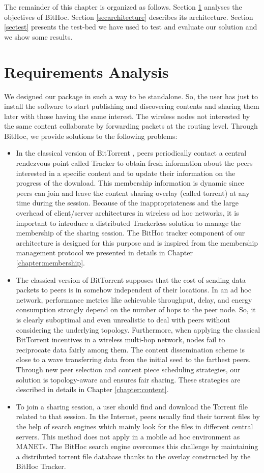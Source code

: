 The remainder of this chapter is organized as follows. Section \ref{secreq} analyses the objectives of BitHoc. Section \ref{secarchitecture} describes its architecture. Section \ref{sectest} presents the test-bed we have used to test and evaluate our solution and we show some results.


\section{Requirements Analysis}
\label{secreq}
 We designed our package in such a way to be standalone. So, the user has just to install the software to start publishing and discovering contents and sharing them later with those having the same interest. The wireless nodes not interested by the same content collaborate by forwarding packets at the routing level. Through BitHoc, we provide solutions to the following problems:
\begin{itemize}
\item{In the classical version of BitTorrent \cite{BitTorrentW}, peers periodically contact a central rendezvous point called Tracker to obtain fresh information about the peers interested in a specific content and to update their information on the progress of the download. This membership information is dynamic since peers can join and leave the content sharing overlay (called torrent) at any time during the session. Because of the inappropriateness and the large overhead of client/server architectures in wireless ad hoc networks, it is important to introduce a distributed Trackerless solution to manage the membership of the sharing session. The BitHoc tracker component of our architecture is designed for this purpose and is inspired from the membership management protocol we presented in details in Chapter \ref{chapter:membership}.}
\item{The classical version of BitTorrent \cite{BitTorrentW} supposes that the cost of sending data packets to peers is in somehow independent of their locations. In an ad hoc network, performance metrics like achievable throughput, delay, and energy consumption strongly depend on the number of hops to the peer node. So, it is clearly suboptimal and even unrealistic to deal with peers without considering the underlying topology. Furthermore, when applying the classical BitTorrent incentives in a wireless multi-hop network, nodes fail to reciprocate data fairly among them. The content dissemination scheme is close to a wave transferring data from the initial seed to the farthest peers. Through new peer selection and content piece scheduling strategies, our solution is topology-aware and ensures fair sharing. These strategies are described in details in Chapter \ref{chapter:content}.}
\item{To join a sharing session, a user should find and download the Torrent file related to that session. In the Internet, peers usually find their torrent files by the help of search engines which mainly look for the files in different central servers. This method does not apply in a mobile ad hoc environment as MANETs. The BitHoc search engine overcomes this challenge by maintaining a distributed torrent file database thanks to the overlay constructed by the BitHoc Tracker.}
\end{itemize}
